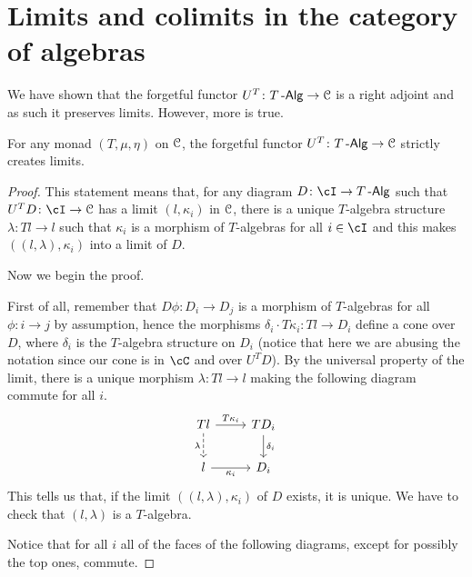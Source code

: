 \documentclass[a4paper,11pt,oneside,openany]{scrbook}
\begin{document}
\section{Limits and colimits in the category of algebras}

We have shown that the forgetful functor $U^T\colon T\operatorname{-\mathsf{Alg}}\rightarrow\operatorname{\mathcal{C}}$ is a
right adjoint and as such it preserves limits. However, more is true.

\begin{prop}\label{create lims}
	For any monad $(T,\mu,\eta)$ on $\operatorname{\mathcal{C}}$, the forgetful functor $U^T\colon T\operatorname{-\mathsf{Alg}}\rightarrow\operatorname{\mathcal{C}}$ strictly creates limits.
\end{prop}

\begin{proof}
	This statement means that, for any diagram $D\colon\cI\rightarrow T\Alg$
	such that $U^TD\colon\cI\rightarrow\C$ has a limit $(l,\kappa_i)$ in $\operatorname{\mathcal{C}}$,
	there is a unique $T$-algebra structure $\lambda\colon Tl\rightarrow l$ such
	that $\kappa_i$ is a morphism of $T$-algebras for all $i\in\cI$ and this
	makes $((l,\lambda),\kappa_i)$ into a limit of $D$.

	Now we begin the proof.

	First of all, remember that $D\phi\colon D_i\rightarrow D_j$ is a morphism
	of $T$-algebras for all $\phi\colon i\rightarrow j$ by assumption, hence the
	morphisms $\delta_i\cdot T\kappa_i\colon Tl\rightarrow D_i$ define a cone
	over $D$, where $\delta_i$ is the $T$-algebra structure on $D_i$ (notice
	that here we are abusing the notation since our cone is in $\cC$ and over
	$U^TD$). By the
	universal property of the limit, there is a unique morphism $\lambda\colon
		Tl\rightarrow l$ making the following diagram commute for all $i$.
	\[
		\begin{tikzcd}
			Tl\ar[d, dashed, "\lambda"'] \ar[r, "T\kappa_i"]
			& TD_i\ar[d, "\delta_i"]\\
			l\ar[r, "\kappa_i"']
			& D_i
		\end{tikzcd}
	\]
	This tells us that, if the limit $((l,\lambda),\kappa_i)$ of $D$ exists, it
	is unique. We have to check that $(l,\lambda)$ is a $T$-algebra.

	Notice that for all $i$ all of the faces of the following diagrams, except
	for possibly the top ones, commute.


\end{proof}
\end{document}
